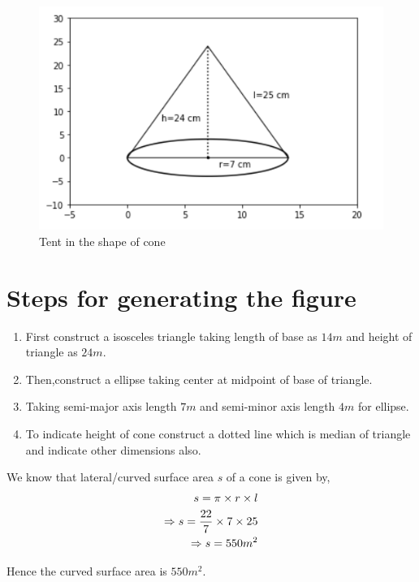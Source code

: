 \documentclass[article,12pt,twocolumn]{IEEEtran}
\begin{document}
  \begin{figure}[ht!]
	  \centering 
	  \includegraphics[width=\columnwidth]{Figs/cone.png}
	  \caption{Tent in the shape of cone}
  \end{figure}
  \section*{Steps for generating the figure}
   \begin{enumerate}
     \item First construct a isosceles triangle taking length of base as $14m$ and height of triangle as $24m$.
     \item Then,construct a ellipse taking center at midpoint of base of triangle.
     \item Taking semi-major axis length $7m$ and semi-minor axis length $4m$ for ellipse.
     \item To indicate height of cone construct a dotted line which is median of triangle and indicate other dimensions also.
   \end{enumerate} 
  
  We know that lateral/curved surface area $s$ of a cone is given
  by,
  \begin{align}
    \hspace*{12pt} s = \pi \times r \times l \\
    \Rightarrow  s = \frac{22}{7} \times 7 \times 25  \\
    \Rightarrow  s = 550 m^2 
  \end{align}
   
  Hence the curved surface area is $ 550 m^2 $. \\\\
 
 
\end{document}
